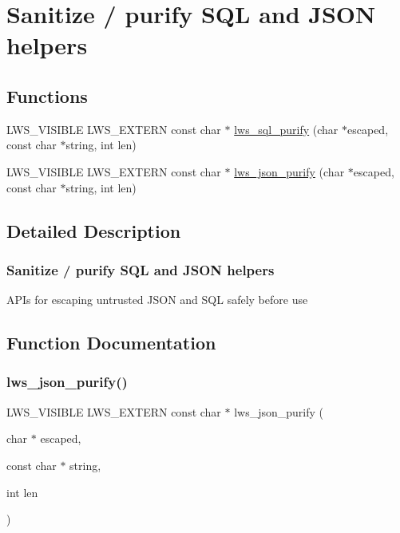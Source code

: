 \hypertarget{group__pur}{}\section{Sanitize / purify S\+QL and J\+S\+ON helpers}
\label{group__pur}
\subsection*{Functions}
\begin{DoxyCompactItemize}
\item 
L\+W\+S\+\_\+\+V\+I\+S\+I\+B\+LE L\+W\+S\+\_\+\+E\+X\+T\+E\+RN const char $\ast$ \hyperlink{group__pur_ga64d6a276bd9258e06b30152bc902a146}{lws\+\_\+sql\+\_\+purify} (char $\ast$escaped, const char $\ast$string, int len)
\item 
L\+W\+S\+\_\+\+V\+I\+S\+I\+B\+LE L\+W\+S\+\_\+\+E\+X\+T\+E\+RN const char $\ast$ \hyperlink{group__pur_ga0375328c87629b345fe8c84f2dc80b81}{lws\+\_\+json\+\_\+purify} (char $\ast$escaped, const char $\ast$string, int len)
\end{DoxyCompactItemize}


\subsection{Detailed Description}
\subsubsection*{Sanitize / purify S\+QL and J\+S\+ON helpers}

A\+P\+Is for escaping untrusted J\+S\+ON and S\+QL safely before use 

\subsection{Function Documentation}
\mbox{\label{group__pur_ga0375328c87629b345fe8c84f2dc80b81}} 
\subsubsection{\texorpdfstring{lws\+\_\+json\+\_\+purify()}{lws\_json\_purify()}}
{\footnotesize\ttfamily L\+W\+S\+\_\+\+V\+I\+S\+I\+B\+LE L\+W\+S\+\_\+\+E\+X\+T\+E\+RN const char $\ast$ lws\+\_\+json\+\_\+purify (\begin{DoxyParamCaption}\item[{char $\ast$}]{escaped,  }\item[{const char $\ast$}]{string,  }\item[{int}]{len }\end{DoxyParamCaption})}

